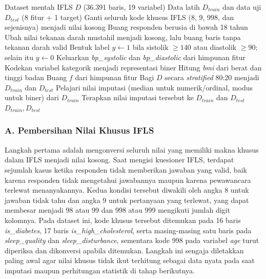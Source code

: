 \begin{algorithm}[htbp]
\caption{Prapemrosesan dan Persiapan Data Hipertensi}
\label{alg:data-prep}
\begin{algorithmic}[1]
\Require Dataset mentah IFLS $D$ (36.391 baris, 19 variabel)
\Ensure Data latih $D_{\mathit{train}}$ dan data uji $D_{\mathit{test}}$ (8 fitur $+$ 1 target)
\State Ganti seluruh kode khusus IFLS (8, 9, 998, dan sejenisnya) menjadi nilai kosong 
\State Buang responden berusia di bawah 18 tahun 
\State Ubah nilai tekanan darah mustahil menjadi kosong, lalu buang baris tanpa tekanan darah valid 
\State Bentuk label $y \gets 1$ bila sistolik $\geq 140$ atau diastolik $\geq 90$; selain itu $y \gets 0$ 
\State Keluarkan \textit{bp\_systolic} dan \textit{bp\_diastolic} dari himpunan fitur 
\State Kodekan variabel kategorik menjadi representasi biner 
\State Hitung \textit{bmi} dari berat dan tinggi badan
        \State Buang $f$ dari himpunan fitur
    \EndIf
\EndFor {}
\State Bagi $D$ secara \emph{stratified} 80:20 menjadi $D_{\mathit{train}}$ dan $D_{\mathit{test}}$ 
\State Pelajari nilai imputasi (median untuk numerik/ordinal, modus untuk biner) dari $D_{\mathit{train}}$
\State Terapkan nilai imputasi tersebut ke $D_{\mathit{train}}$ dan $D_{\mathit{test}}$
\State \Return $D_{\mathit{train}}, D_{\mathit{test}}$
\end{algorithmic}
\end{algorithm}

\subsubsection*{A. Pembersihan Nilai Khusus IFLS}
Langkah pertama adalah mengonversi seluruh nilai yang memiliki makna khusus dalam IFLS menjadi nilai kosong. Saat mengisi kuesioner IFLS, terdapat sejumlah kasus ketika responden tidak memberikan jawaban yang valid, baik karena responden tidak mengetahui jawabannya maupun karena pewawancara terlewat menanyakannya. Kedua kondisi tersebut diwakili oleh angka 8 untuk jawaban tidak tahu dan angka 9 untuk pertanyaan yang terlewat, yang dapat membesar menjadi 98 atau 99 dan 998 atau 999 mengikuti jumlah digit kolomnya. Pada dataset ini, kode khusus tersebut ditemukan pada 16 baris \textit{is\_diabetes}, 17 baris \textit{is\_high\_cholesterol}, serta masing-masing satu baris pada \textit{sleep\_quality} dan \textit{sleep\_disturbance}, sementara kode 998 pada variabel \textit{age} turut diperiksa dan dikonversi apabila ditemukan. Langkah ini sengaja diletakkan paling awal agar nilai khusus tidak ikut terhitung sebagai data nyata pada saat imputasi maupun perhitungan statistik di tahap berikutnya.

